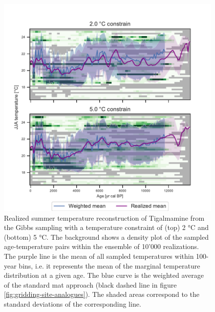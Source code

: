 \documentclass[
11pt, %
english, %
singlespacing, %
headsepline, %
]{MastersDoctoralThesis} %
\begin{document}
\begin{NoHyper}
\begin{refsection}
\begin{figure}
	\includegraphics[width=\linewidth]{gridding-figures/realized-temperature-tigalmamine.pdf}
	\caption[Realized summer temperature reconstruction of Tigalmamine with different constraints]{Realized summer temperature reconstruction of Tigalmamine from the Gibbs sampling with a temperature constraint of (top) 2 °C and (bottom) 5 °C. The background shows a density plot of the sampled age-temperature pairs within the ensemble of 10'000 realizations. The purple line is the mean of all sampled temperatures within 100-year bins, i.e. it represents the mean of the marginal temperature distribution at a given age. The blue curve is the weighted average of the standard \gls{mat} approach (black dashed line in figure \ref{fig:gridding-site-analogues}). The shaded areas correspond to the standard deviations of the corresponding line.}
	\label{fig:gridding-tigal-recon}
\end{figure}


\end{refsection}
\end{NoHyper}
\end{document}
